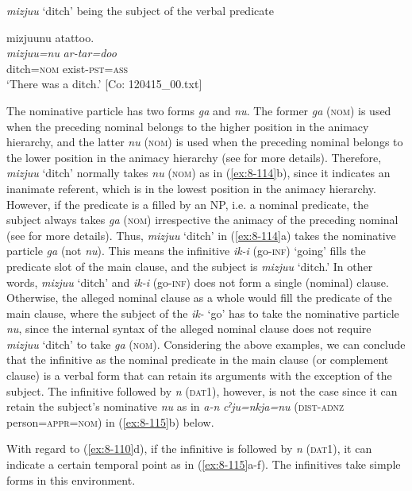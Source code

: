 \ex \textit{mizjuu} ‘ditch’ being the subject of the verbal predicate

  {\TM}
\glll  mizjuunu  atattoo.\\
\textit{mizjuu=nu}  \textit{ar-tar=doo}      \\

    ditch=\textsc{nom}  exist-\textsc{pst}=\textsc{ass}\\
\glt ‘There was a ditch.’ [Co: 120415\_00.txt]
\z
\z

The nominative particle has two forms \textit{ga} and \textit{nu}. The former \textit{ga} (\textsc{nom}) is used when the preceding nominal belongs to the higher position in the animacy hierarchy, and the latter \textit{nu} (\textsc{nom}) is used when the preceding nominal belongs to the lower position in the animacy hierarchy (see  for more details). Therefore, \textit{mizjuu} ‘ditch’ normally takes \textit{nu} (\textsc{nom}) as in (\ref{ex:8-114}b), since it indicates an inanimate referent, which is in the lowest position in the animacy hierarchy. However, if the predicate is a filled by an NP, i.e. a nominal predicate, the subject always takes \textit{ga} (\textsc{nom}) irrespective the animacy of the preceding nominal (see  for more details). Thus, \textit{mizjuu} ‘ditch’ in (\ref{ex:8-114}a) takes the nominative particle \textit{ga} (not \textit{nu}). This means the infinitive \textit{ik-i} (go-\textsc{inf}) ‘going’ fills the predicate slot of the main clause, and the subject is \textit{mizjuu} ‘ditch.’ In other words, \textit{mizjuu} ‘ditch’ and \textit{ik-i} (go-\textsc{inf}) does not form a single (nominal) clause. Otherwise, the alleged nominal clause as a whole would fill the predicate of the main clause, where the subject of the \textit{ik-} ‘go’ has to take the nominative particle \textit{nu}, since the internal syntax of the alleged nominal clause does not require \textit{mizjuu} ‘ditch’ to take \textit{ga} (\textsc{nom}). Considering the above examples, we can conclude that the infinitive as the nominal predicate in the main clause (or complement clause) is a verbal form that can retain its arguments with the exception of the subject. The infinitive followed by \textit{n} (\textsc{dat1}), however, is not the case since it can retain the subject’s nominative \textit{nu} as in \textit{a-n} \textit{cˀju=nkja=nu} (\textsc{dist}-\textsc{adnz} person=\textsc{appr}=\textsc{nom}) in (\ref{ex:8-115}b) below.

  With regard to (\ref{ex:8-110}d), if the infinitive is followed by \textit{n} (\textsc{dat1}), it can indicate a certain temporal point as in (\ref{ex:8-115}a-f). The infinitives take simple forms in this environment.

